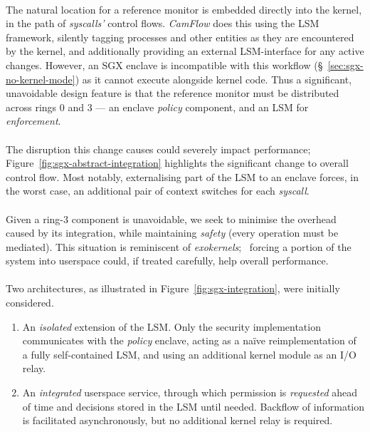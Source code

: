 \paragraph{} The natural location for a reference monitor is embedded directly into the kernel, in the path of \textit{syscalls'} control flows. \textit{CamFlow} does this using the LSM framework, silently tagging processes and other entities as they are encountered by the kernel, and additionally providing an external LSM-interface for any active changes. However, an SGX enclave is incompatible with this workflow (§~\ref{sec:sgx-no-kernel-mode}) as it cannot execute alongside kernel code. Thus a significant, unavoidable design feature is that the reference monitor must be distributed across rings 0 and 3 --- an enclave \textit{policy} component, and an LSM for \textit{enforcement}.

\paragraph{} The disruption this change causes could severely impact performance; Figure~\ref{fig:sgx-abstract-integration} highlights the significant change to overall control flow. Most notably, externalising part of the LSM to an enclave forces, in the worst case, an additional pair of context switches for each \textit{syscall}.

\paragraph{} Given a ring-3 component is unavoidable, we seek to minimise the overhead caused by its integration, while maintaining \textit{safety} (every operation must be mediated). This situation is reminiscent of \textit{exokernels};~\cite{10.1145/224056.224076} forcing a portion of the system into userspace could, if treated carefully, help overall performance.~\cite{10.1145/269005.266644} 

\paragraph{} Two architectures, as illustrated in Figure~\ref{fig:sgx-integration}, were initially considered. 

\begin{enumerate}
    \item An \textit{isolated} extension of the LSM. Only the security implementation communicates with the \textit{policy} enclave, acting as a na\"{i}ve reimplementation of a fully self-contained LSM, and using an additional kernel module as an I/O relay.
    \item An \textit{integrated} userspace service, through which permission is \textit{requested} ahead of time and decisions stored in the LSM until needed. Backflow of information is facilitated asynchronously, but no additional kernel relay is required.
\end{enumerate}



